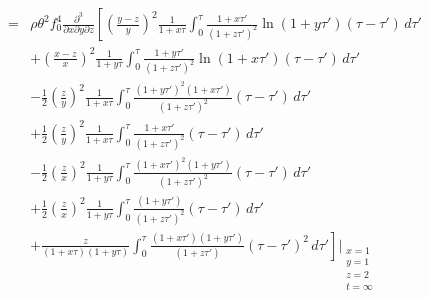 \documentclass[11pt]{article}
\begin{document}
\begin{align}
    =&\rho \theta^2 f_0^4 \frac{\partial^3}{\partial x \partial y \partial z} \left[ \left(\frac{y-z}{y}\right)^2 \frac{1}{1+x\tau} \int_0^{\tau} \frac{1+x\tau'}{(1+z\tau')^2} \ln(1+y\tau') (\tau-\tau') \,d\tau' \right. \\\nonumber
    &+ \left. \left(\frac{x-z}{x}\right)^2 \frac{1}{1+y\tau} \int_0^{\tau} \frac{1+y\tau'}{(1+z\tau')^2} \ln(1+x\tau') (\tau-\tau') \,d\tau' \right. \\\nonumber
    &- \left. \frac{1}{2} \left(\frac{z}{y}\right)^2 \frac{1}{1+x\tau} \int_0^{\tau}  \frac{(1+y\tau')^2(1+x\tau')}{(1+z\tau')^2} (\tau-\tau') \,d\tau' \right. \\\nonumber
    &+ \left. \frac{1}{2} \left(\frac{z}{y}\right)^2 \frac{1}{1+x\tau} \int_0^{\tau}  \frac{1+x\tau'}{(1+z\tau')^2} (\tau-\tau') \,d\tau' \right. \\\nonumber
    &- \left. \frac{1}{2} \left(\frac{z}{x}\right)^2 \frac{1}{1+y\tau} \int_0^{\tau} \frac{(1+x\tau')^2(1+y\tau')}{(1+z\tau')^2} (\tau-\tau') \,d\tau' \right. \\\nonumber
    &+ \left. \frac{1}{2} \left(\frac{z}{x}\right)^2 \frac{1}{1+y\tau} \int_0^{\tau} \frac{(1+y\tau')}{(1+z\tau')^2} (\tau-\tau') \,d\tau' \right. \\\nonumber
    &+ \left. \frac{z}{(1+x\tau)(1+y\tau)}\int_0^{\tau} \frac{(1+x\tau')(1+y\tau')}{(1+z\tau')} (\tau-\tau')^2 \,d\tau' \right]\Bigg\vert_{\substack{x=1 \\ y=1 \\ z=2 \\ t=\infty}}
\end{align}
\end{document}

